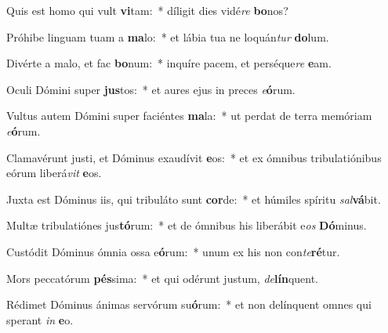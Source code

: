 \item Quis est homo qui vult \textbf{vi}tam:~* díligit dies vidé\textit{re} \textbf{bo}nos?
\item Próhibe linguam tuam a \textbf{ma}lo:~* et lábia tua ne loquán\textit{tur} \textbf{do}lum.
\item Divérte a malo, et fac \textbf{bo}num:~* inquíre pacem, et perséque\textit{re} \textbf{e}am.
\item Oculi Dómini super \textbf{jus}tos:~* et aures ejus in preces \textit{e}\textbf{ó}rum.
\item Vultus autem Dómini super faciéntes \textbf{ma}la:~* ut perdat de terra memóriam \textit{e}\textbf{ó}rum.
\item Clamavérunt justi, et Dóminus exaudívit \textbf{e}os:~* et ex ómnibus tribulatiónibus eórum liberá\textit{vit} \textbf{e}os.
\item Juxta est Dóminus iis, qui tribuláto sunt \textbf{cor}de:~* et húmiles spíritu \textit{sal}\textbf{vá}bit.
\item Multæ tribulatiónes jus\textbf{tó}rum:~* et de ómnibus his liberábit e\textit{os} \textbf{Dó}minus.
\item Custódit Dóminus ómnia ossa e\textbf{ó}rum:~* unum ex his non con\textit{te}\textbf{ré}tur.
\item Mors peccatórum \textbf{pés}sima:~* et qui odérunt justum, \textit{de}\textbf{lín}quent.
\item Rédimet Dóminus ánimas servórum su\textbf{ó}rum:~* et non delínquent omnes qui sperant \textit{in} \textbf{e}o.
